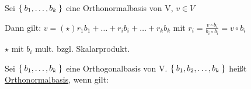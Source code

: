 \documentclass{../tudscript}
\begin{document}
	    Sei $\Set{b_1, \ldots, b_k}$ eine Orthonormalbasis von V, $v \in V$
	    
	    Dann gilt: $v =(\star) r_1 b_1 + \ldots + r_i b_i + \ldots + r_k b_k$ mit $\boxed{r_i = \frac{v \circ b_i}{b_i \circ b_i} = v \circ b_i}$
	    
	
	    $\star$ mit $b_i$ mult. bzgl. Skalarprodukt.
	   
	    Sei $\Set{b_1, \ldots, b_k}$ eine Orthogonalbasis von V. 
	    $\Set{b_1, b_2, \ldots, b_k}$ heißt \underline{Orthonormalbasis}, wenn gilt:
	    
\end{document}
